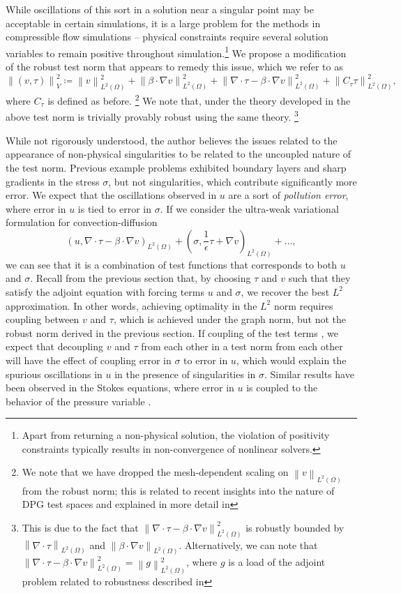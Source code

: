 \documentclass[letterpaper]{article}
\newcommand{\secref}[1]{\ref{sec:#1}}
\newcommand{\norm}[1]{\left\| #1 \right\|}
\newcommand{\LRp}[1]{\left( #1 \right)}
\newcommand{\Grad} {\ensuremath{\nabla}}
\renewcommand{\L}{L^2\LRp{\Omega}}
\newcommand{\grad}{\nabla}
\renewcommand{\div}{\grad \cdot}
\begin{document}
While oscillations of this sort in a solution near a singular point may be
acceptable in certain simulations, it is a large problem for the methods in
compressible flow simulations -- physical constraints require several solution
variables to remain positive throughout simulation.\footnote{Apart from
returning a non-physical solution, the violation of positivity constraints
typically results in non-convergence of nonlinear solvers.}  We propose a
modification of the robust test norm that appears to remedy this issue, which
we refer to as 
\[
\norm{\LRp{v,\tau}}_V^2 \coloneqq \norm{v}^2_{\L} + \norm{\beta\cdot \Grad v}_{\L}^2 + \norm{\div \tau - \beta\cdot\Grad v}_{\L}^2 + \norm{C_\tau\tau}_{\L}^2,
\]
where $C_\tau$ is defined as before.
\footnote{
We note that we have dropped the
mesh-dependent scaling on $\norm{v}_{\L}$ from the robust norm; this is related
to recent insights into the nature of DPG test spaces and explained in more
detail in %
}  
We note that, under the
theory developed in 
the above test norm is
trivially provably robust using the same theory.
\footnote{This is due to the
fact that $\norm{\div \tau - \beta\cdot\Grad v}_{\L}^2$ is robustly bounded by
$\norm{\div \tau}_{\L}$ and $\norm{\beta\cdot\Grad v}_{\L}$.  Alternatively, we
can note that $\norm{\div \tau - \beta\cdot\Grad v}_{\L}^2 = \norm{g}_{\L}^2$,
where $g$ is a load of the adjoint problem related to robustness described in
}

While not rigorously understood, the author believes the issues related to the
appearance of non-physical singularities to be related to the uncoupled nature
of the test norm.  Previous example problems exhibited boundary layers and
sharp gradients in the stress $\sigma$, but not singularities, which
contribute significantly more error.  We expect that the oscillations observed
in $u$ are a sort of \textit{pollution error}, where error in $u$ is tied to
error in $\sigma$.  If we consider the ultra-weak variational formulation for
convection-diffusion
\[
\LRp{u,\div \tau - \beta\cdot \grad v}_{\L} + \LRp{\sigma,\frac{1}{\epsilon} \tau + \grad v}_{\L} + \ldots,
\]
we can see that it is a combination of test functions that corresponds to both
$u$ and $\sigma$.  Recall from the previous section that, by choosing $\tau$
and $v$ such that they satisfy the adjoint equation with forcing terms $u$ and
$\sigma$, we recover the best $L^2$ approximation.  In other words, achieving
optimality in the $L^2$ norm requires coupling between $v$ and $\tau$, which
is achieved under the graph norm, but not the robust norm derived in the
previous section.  If coupling of the test terms , we expect that decoupling
$v$ and $\tau$ from each other in a test norm from each other will have the
effect of coupling error in $\sigma$ to error in $u$, which would explain the
spurious oscillations in $u$ in the presence of singularities in $\sigma$.
Similar results have been observed in the Stokes equations, where error in $u$
is coupled to the behavior of the pressure variable \cite{FLD:FLD582}.  
\end{document}
